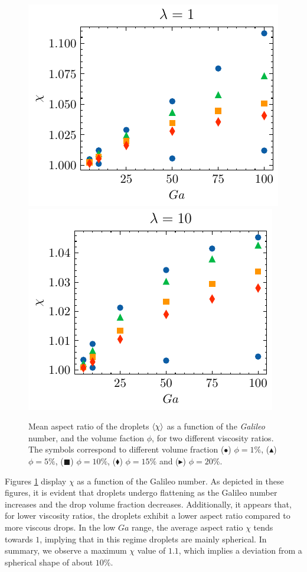 \documentclass[12pt]{My_preprint}
\begin{document}
\begin{figure}[h!]
    \centering
    \includegraphics[height = 0.35\textwidth]{image/HOMOGENEOUS/fPA/chi_mu_r_1-0.pdf}
    \includegraphics[height = 0.35\textwidth]{image/HOMOGENEOUS/fPA/chi_mu_r_0-1.pdf}
    \caption{Mean aspect ratio of the droplets $\left<\chi\right>$ as a function of the \textit{Galileo} number, and the volume faction $\phi$,  for two different viscosity ratios.  
    The symbols correspond to different volume fraction ($\bullet$) $\phi = 1\%$, ($\blacktriangle$) $\phi = 5\%$, ($\blacksquare$) $\phi = 10\%$, ($\blacklozenge$) $\phi = 15\%$ and ($\blacktriangleright$) $\phi = 20$\%.
    }
    \label{fig:chi}
\end{figure}



Figures \ref{fig:chi}  display $\chi$ as a function of the Galileo number. %
As depicted in these figures, it is evident that droplets undergo flattening as the Galileo number increases and the drop volume fraction decreases. Additionally, it appears that, for lower viscosity ratios, the droplets exhibit a lower aspect ratio compared to more viscous drops. In the low $Ga$ range, the average aspect ratio $\chi$ tends towards $1$, implying that in this regime droplets are mainly spherical. In summary, we observe a maximum $\chi$ value of $1.1$, which implies a deviation from a spherical shape of about $10 \%$. %
\end{document}
